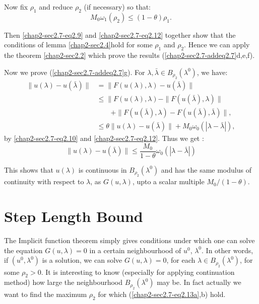 Now fix $\rho_1$ and reduce $\rho_2$ (if necessary) so that:
\begin{equation*}
 M_0 \omega_1(\rho_2) \le (1 - \theta)
 \rho_1. \tag{2.13b}\label{chap2-sec2.7-eq2.13b}        
\end{equation*}

Then \eqref{chap2-sec2.7-eq2.9} and \eqref{chap2-sec2.7-eq2.12}
together show that the conditions of lemma 
\eqref{chap2-sec2.4}\pageoriginale hold for some $\rho_1$ and
$\rho_2$. Hence we can apply the 
theorem \eqref{chap2-sec2.2} which prove the results
(\ref{chap2-sec2.7-addeq2.7}d,e,f).   

Now we prove (\ref{chap2-sec2.7-addeq2.7}g). For $\lambda,
\bar{\lambda} \in B_{\rho_2}(\lambda^0)$, we have: 
\begin{align*}
\| u(\lambda) - u(\bar{\lambda}) \| & = \| F(u(\lambda), \lambda) -
u(\bar{\lambda}) \| \\ 
& \le \| F(u(\lambda), \lambda) - \| F(u(\bar{\lambda}), \lambda) \|\\ 
& \qquad + \| F(u(\bar{\lambda}), \lambda) - F(u(\bar{\lambda}),
\bar{\lambda}) \|, \\ 
& \le \theta \| u(\lambda) - u(\bar{\lambda}) \| + M_0 \omega_0 (|
\lambda - \bar{\lambda} |), 
\end{align*}
by \eqref{chap2-sec2.7-eq2.10} and \eqref{chap2-sec2.7-eq2.12}. Thus we get :
$$
\| u (\lambda) - u(\bar{\lambda}) \| \le \frac{M_0}{1-\theta} \omega_0
(|\lambda - \bar{\lambda}|) 
$$

This shows that $u(\lambda)$ is continuous in $B_{\rho_2}(\lambda^0)$
and has the same modulus of continuity with respect to $\lambda$, as
$G(u, \lambda)$, upto a scalar multiple $M_0 / (1-\theta)$. 


\setcounter{section}{13}
\section{Step Length Bound}\label{chap2-sec2.14}      

The Implicit function theorem simply gives conditions under which one
can solve the equation $G(u, \lambda) = 0$ in a certain neighbourhood
of $u^0$, $\lambda^0$. In other words, if $(u^0, \lambda^0)$ is a
solution, we can solve $G(u, \lambda) = 0$, for each $\lambda \in
B_{\rho_2}(\lambda^0)$, for some $\rho_2 > 0$. It is interesting to
know (especially for applying continuation method) how large the
neighbourhood $B_{\rho_2}(\lambda^0)$ may be. In fact actually we want
to find the maximum $\rho_2$ for which (\ref{chap2-sec2.7-eq2.13a},b) hold. 

